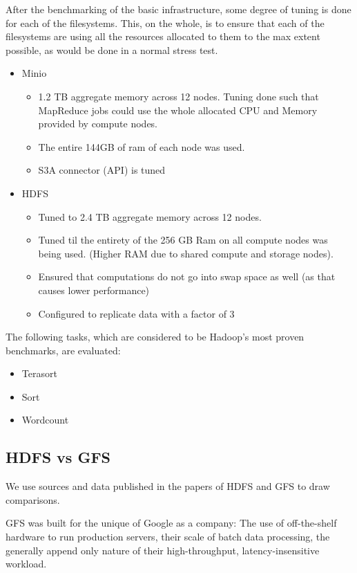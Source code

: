 \documentclass{article}
\begin{document}
After the benchmarking of the basic infrastructure, some degree of tuning is done for each of the filesystems. This, on the whole, is to ensure that each of the filesystems are using all the resources allocated to them to the max extent possible, as would be done in a normal stress test.

\begin{itemize}
    \item Minio
        \begin{itemize}
            \item 1.2 TB aggregate memory across 12 nodes. Tuning done such that MapReduce jobs could use the whole allocated CPU and Memory provided by compute nodes.
            \item The entire 144GB of ram of each node was used.
            \item S3A connector (API) is tuned
        \end{itemize}
    \item HDFS
        \begin{itemize}
            \item Tuned to 2.4 TB aggregate memory across 12 nodes. 
            \item Tuned til the entirety of the 256 GB Ram on all compute nodes was being used. (Higher RAM due to shared compute and storage nodes).
            \item Ensured that computations do not go into swap space as well (as that causes lower performance)
            \item Configured to replicate data with a factor of 3
        \end{itemize}
\end{itemize}

The following tasks, which are considered to be Hadoop's most proven benchmarks, are evaluated:
\begin{itemize}
    \item Terasort
    \item Sort
    \item Wordcount
\end{itemize}


\subsection{HDFS vs GFS}
We use sources \cite{lecturehdfsvsgfs} and data published in the papers of HDFS
and GFS to draw comparisons.

GFS was built for the unique of Google as a company: The use of off-the-shelf
hardware to run production servers, their scale of batch data processing, the
generally append only nature of their high-throughput, latency-insensitive
workload. 
\end{document}
